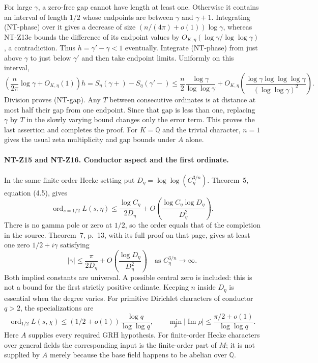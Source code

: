 For large $\gamma$, a zero-free gap cannot have length at least one.
Otherwise it contains an interval of length $1/2$ whose endpoints
are between $\gamma$ and $\gamma+1$.  Integrating (NT-phase) over it
gives a decrease of size $(n/(4\pi)+o(1))\log\gamma$, whereas
NT-Z13c bounds the difference of its endpoint values by
$O_{K,\eta}(\log\gamma/\log\log\gamma)$, a contradiction.
Thus $h=\gamma'-\gamma<1$ eventually.  Integrate (NT-phase) from
just above $\gamma$ to just below $\gamma'$ and then take endpoint
limits.  Uniformly on this interval,
\[
 \left(\frac n{2\pi}\log\gamma+O_{K,\eta}(1)\right)h
   =S_\eta(\gamma+)-S_\eta(\gamma'-)
   \le\frac n2\frac{\log\gamma}{\log\log\gamma}
      +O_{K,\eta}\left(
       \frac{\log\gamma\log\log\log\gamma}
            {(\log\log\gamma)^2}\right).
\]
Division proves (NT-gap).  Any $T$ between consecutive ordinates is
at distance at most half their gap from one endpoint.  Since that
gap is less than one, replacing $\gamma$ by $T$ in the slowly varying
bound changes only the error term.  This proves the last assertion
and completes the proof.  For $K=\mathbb Q$ and the trivial
character, $n=1$ gives the usual zeta multiplicity and gap bounds
under $A$ alone.

\paragraph{NT-Z15 and NT-Z16. Conductor aspect and the first ordinate.}
In the same finite-order Hecke setting put
$D_\eta=\log\log(C_\eta^{3/n})$.
Theorem~5, equation (4.5), gives
\[
 \operatorname{ord}_{s=1/2}L(s,\eta)
 \le\frac{\log C_\eta}{2D_\eta}
   +O\left(\frac{\log C_\eta\log D_\eta}{D_\eta^2}\right).
\tag{NT-Z15}
\]
There is no gamma pole or zero at $1/2$, so the order equals that
of the completion in the source.  Theorem~7, p.~13, with its full
proof on that page, gives at least one zero $1/2+i\gamma$ satisfying
\[
 |\gamma|\le\frac{\pi}{2D_\eta}
          +O\left(\frac{\log D_\eta}{D_\eta^2}\right)
 \quad\text{as } C_\eta^{3/n}\longrightarrow\infty.
\tag{NT-Z16}
\]
Both implied constants are universal.  A possible central zero is
included: this is not a bound for the first strictly positive
ordinate.  Keeping $n$ inside $D_\eta$ is essential when the degree
varies.  For primitive Dirichlet characters of conductor $q>2$, the
specializations are
\[
 \operatorname{ord}_{1/2}L(s,\chi)
       \le(1/2+o(1))\frac{\log q}{\log\log q},\qquad
 \min_\rho|\operatorname{Im}\rho|
       \le\frac{\pi/2+o(1)}{\log\log q}.
\]
Here $A$ supplies every required GRH hypothesis.  For finite-order
Hecke characters over general fields the corresponding input is
the finite-order part of $M$; it is not supplied by $A$ merely
because the base field happens to be abelian over $\mathbb Q$.

